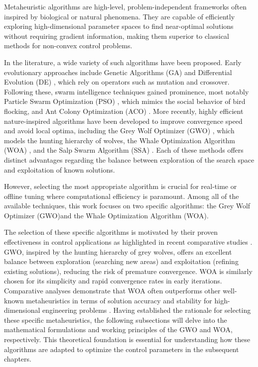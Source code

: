 Metaheuristic algorithms are high-level, problem-independent frameworks often inspired by biological or natural phenomena. They are capable of efficiently exploring high-dimensional parameter spaces to find near-optimal solutions without requiring gradient information, making them superior to classical methods for non-convex control problems.

In the literature, a wide variety of such algorithms have been proposed. Early evolutionary approaches include Genetic Algorithms (GA)  \cite{GA_Ref} and Differential Evolution (DE)  \cite{DE_Ref}, which rely on operators such as mutation and crossover. Following these, swarm intelligence techniques gained prominence, most notably Particle Swarm Optimization (PSO)  \cite{PSO_Ref}, which mimics the social behavior of bird flocking, and Ant Colony Optimization (ACO)  \cite{ACO_Ref}. More recently, highly efficient nature-inspired algorithms have been developed to improve convergence speed and avoid local optima, including the Grey Wolf Optimizer (GWO)  \cite{gwo}, which models the hunting hierarchy of wolves, the Whale Optimization Algorithm (WOA)  \cite{woa}, and the Salp Swarm Algorithm (SSA)  \cite{SSA_Ref}. Each of these methods offers distinct advantages regarding the balance between exploration of the search space and exploitation of known solutions.

However, selecting the most appropriate algorithm is crucial for real-time or offline tuning where computational efficiency is paramount. Among all of the available techniques, this work focuses on two specific algorithms: the Grey Wolf Optimizer (GWO)and the Whale Optimization Algorithm (WOA). 

The selection of these specific algorithms is motivated by their proven effectiveness in control applications as highlighted in recent comparative studies  \cite{9064786,gwo}. GWO, inspired by the hunting hierarchy of grey wolves, offers an excellent balance between exploration (searching new areas) and exploitation (refining existing solutions), reducing the risk of premature convergence. WOA is similarly chosen for its simplicity and rapid convergence rates in early iterations. Comparative analyses demonstrate that WOA often outperforms other well-known metaheuristics in terms of solution accuracy and stability for high-dimensional engineering problems  \cite{gwo}.
Having established the rationale for selecting these specific metaheuristics, the following subsections will delve into the mathematical formulations and working principles of the GWO and WOA, respectively. This theoretical foundation is essential for understanding how these algorithms are adapted to optimize the control parameters in the subsequent chapters.


